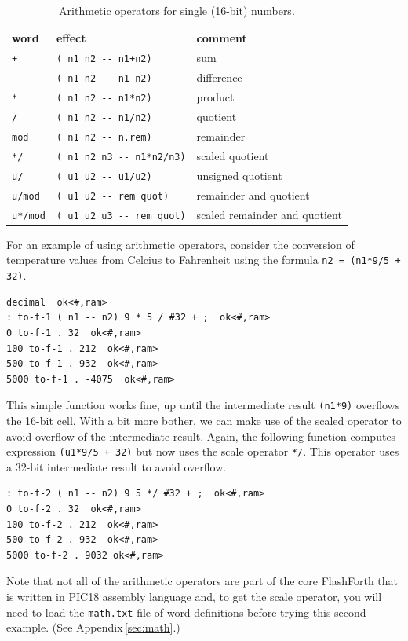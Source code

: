\documentclass[12pt,a4paper]{article}
\begin{document}
\begin{table}[htb]
 \caption{Arithmetic operators for single (16-bit) numbers.}
 \label{tab:arithmetic-operators}
 \centering
 \begin{tabular}{lll}
  \hline
  word & effect & comment \\
  \hline
  \verb!+! & \verb!( n1 n2 -- n1+n2)! & sum \\
  \verb!-! & \verb!( n1 n2 -- n1-n2)! & difference \\
  \verb!*! & \verb!( n1 n2 -- n1*n2)! & product \\
  \verb!/! & \verb!( n1 n2 -- n1/n2)! & quotient \\
  \verb!mod! & \verb!( n1 n2 -- n.rem)! & remainder \\
  \verb!*/! & \verb!( n1 n2 n3 -- n1*n2/n3)! & scaled quotient \\
  \verb!u/! & \verb!( u1 u2 -- u1/u2)! & unsigned quotient \\
  \verb!u/mod! & \verb!( u1 u2 -- rem quot)! & remainder and quotient \\
  \verb!u*/mod! & \verb!( u1 u2 u3 -- rem quot)! & scaled remainder and quotient \\
  \hline
 \end{tabular}
\end{table}

\medskip
For an example of using arithmetic operators, consider the 
conversion of temperature values from Celcius to Fahrenheit 
using the formula \verb!n2 = (n1*9/5 + 32)!.
\begin{verbatim}
decimal  ok<#,ram>
: to-f-1 ( n1 -- n2) 9 * 5 / #32 + ;  ok<#,ram>
0 to-f-1 . 32  ok<#,ram>
100 to-f-1 . 212  ok<#,ram>
500 to-f-1 . 932  ok<#,ram>
5000 to-f-1 . -4075  ok<#,ram>
\end{verbatim}
This simple function works fine, up until the intermediate result
\verb!(n1*9)! overflows the 16-bit cell.
With a bit more bother, we can make use of the scaled operator 
to avoid overflow of the intermediate result.
Again, the following function computes expression \verb!(u1*9/5 + 32)!
but now uses the scale operator \verb!*/!. 
This operator uses a 32-bit intermediate result to avoid overflow.
\begin{verbatim}
: to-f-2 ( n1 -- n2) 9 5 */ #32 + ;  ok<#,ram>
0 to-f-2 . 32  ok<#,ram>
100 to-f-2 . 212  ok<#,ram>
500 to-f-2 . 932  ok<#,ram>
5000 to-f-2 . 9032 ok<#,ram>  
\end{verbatim}
Note that not all of the arithmetic operators are part of the core FlashForth
that is written in PIC18 assembly language and, to get the scale operator,
you will need to load the \verb!math.txt! file of word definitions before
trying this second example.  (See Appendix\,\ref{sec:math}.)
\end{document}
